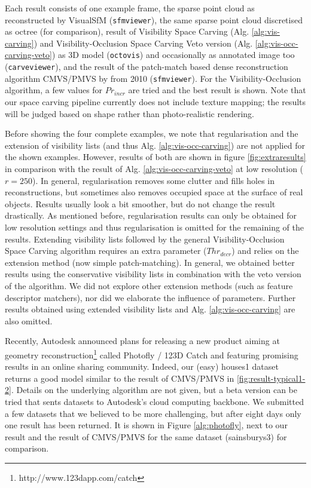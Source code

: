 Each result consists of one example frame, the sparse point cloud as reconstructed by VisualSfM (\texttt{sfmviewer}), the same sparse point cloud discretised as octree (for comparison), result of Visibility Space Carving (Alg. \ref{alg:vis-carving}) and Visibility-Occlusion Space Carving Veto version (Alg. \ref{alg:vis-occ-carving-veto}) as 3D model (\texttt{octovis}) and occasionally as annotated image too (\texttt{carveviewer}), and the result of the patch-match based dense reconstruction algorithm CMVS/PMVS by  from 2010 (\texttt{sfmviewer}). For the Visibility-Occlusion algorithm, a few values for $Pr_{incr}$ are tried and the best result is shown. Note that our space carving pipeline currently does not include texture mapping; the results will be judged based on shape rather than photo-realistic rendering.

Before showing the four complete examples, we note that regularisation and the extension of visibility lists (and thus Alg. \ref{alg:vis-occ-carving}) are not applied for the shown examples. However, results of both are shown in figure \ref{fig:extraresults} in comparison with the result of Alg. \ref{alg:vis-occ-carving-veto} at low resolution ($r=250$). In general, regularisation removes some clutter and fills holes in reconstructions, but sometimes also removes occupied space at the surface of real objects. Results usually look a bit smoother, but do not change the result drastically. As mentioned before, regularisation results can only be obtained for low resolution settings and thus regularisation is omitted for the remaining of the results. Extending visibility lists followed by the general Visibility-Occlusion Space Carving algorithm requires an extra parameter ($Thr_{decr}$) and relies on the extension method (now simple patch-matching). In general, we obtained better results using the conservative visibility lists in combination with the veto version of the algorithm. We did not explore other extension methods (such as feature descriptor matchers), nor did we elaborate the influence of parameters. Further results obtained using extended visibility lists and Alg. \ref{alg:vis-occ-carving} are also omitted.

Recently, Autodesk announced plans for releasing a new product aiming at geometry reconstruction\footnote{http://www.123dapp.com/catch} called Photofly / 123D Catch and featuring promising results in an online sharing community. Indeed, our (easy) houses1 dataset returns a good model similar to the result of CMVS/PMVS in \ref{fig:result-typical1-2}. Details on the underlying algorithm are not given, but a beta version can be tried that sents datasets to Autodesk's cloud computing backbone. We submitted a few datasets that we believed to be more challenging, but after eight days only one result has been returned. It is shown in Figure \ref{alg:photofly}, next to our result and the result of CMVS/PMVS for the same dataset (sainsburys3) for comparison.

